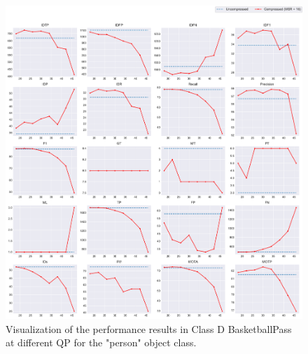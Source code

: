 \begin{figure}[!htbp]
  \centering
  \includegraphics[width=1.0\linewidth]{img/BasketballPass_0_multiplots_qp.pdf}
  \caption[Visualization of the performance results in Class D BasketballPass at different QP for the "person" object class]
  {Visualization of the performance results in Class D BasketballPass at different QP for the "person" object class.
  }
  \label{fig:BasketballPass_0_multiplots_qp}
\end{figure}